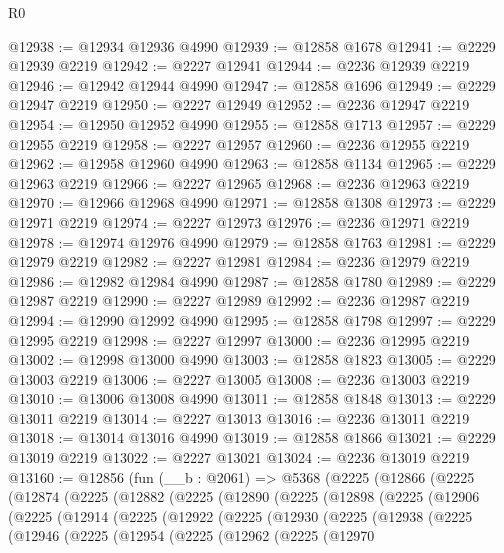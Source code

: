 \begin{lexlean}{R0}
\begin{coremodule}
@12938 := @12934 @12936 @4990
@12939 := @12858 @1678
@12941 := @2229 @12939 @2219
@12942 := @2227 @12941
@12944 := @2236 @12939 @2219
@12946 := @12942 @12944 @4990
@12947 := @12858 @1696
@12949 := @2229 @12947 @2219
@12950 := @2227 @12949
@12952 := @2236 @12947 @2219
@12954 := @12950 @12952 @4990
@12955 := @12858 @1713
@12957 := @2229 @12955 @2219
@12958 := @2227 @12957
@12960 := @2236 @12955 @2219
@12962 := @12958 @12960 @4990
@12963 := @12858 @1134
@12965 := @2229 @12963 @2219
@12966 := @2227 @12965
@12968 := @2236 @12963 @2219
@12970 := @12966 @12968 @4990
@12971 := @12858 @1308
@12973 := @2229 @12971 @2219
@12974 := @2227 @12973
@12976 := @2236 @12971 @2219
@12978 := @12974 @12976 @4990
@12979 := @12858 @1763
@12981 := @2229 @12979 @2219
@12982 := @2227 @12981
@12984 := @2236 @12979 @2219
@12986 := @12982 @12984 @4990
@12987 := @12858 @1780
@12989 := @2229 @12987 @2219
@12990 := @2227 @12989
@12992 := @2236 @12987 @2219
@12994 := @12990 @12992 @4990
@12995 := @12858 @1798
@12997 := @2229 @12995 @2219
@12998 := @2227 @12997
@13000 := @2236 @12995 @2219
@13002 := @12998 @13000 @4990
@13003 := @12858 @1823
@13005 := @2229 @13003 @2219
@13006 := @2227 @13005
@13008 := @2236 @13003 @2219
@13010 := @13006 @13008 @4990
@13011 := @12858 @1848
@13013 := @2229 @13011 @2219
@13014 := @2227 @13013
@13016 := @2236 @13011 @2219
@13018 := @13014 @13016 @4990
@13019 := @12858 @1866
@13021 := @2229 @13019 @2219
@13022 := @2227 @13021
@13024 := @2236 @13019 @2219
@13160 := @12856
    (fun (__b : @2061) =>
    @5368
      (@2225
        (@12866
          (@2225
            (@12874
              (@2225
                (@12882
                  (@2225
                    (@12890
                      (@2225
                        (@12898
                          (@2225
                            (@12906
                              (@2225
                                (@12914
                                  (@2225
                                    (@12922
                                      (@2225
                                        (@12930
                                          (@2225
                                            (@12938
                                              (@2225
                                                (@12946
                                                  (@2225
                                                    (@12954
                                                      (@2225
                                                        (@12962
                                                          (@2225
                                                            (@12970

\end{coremodule}
\end{lexlean}
